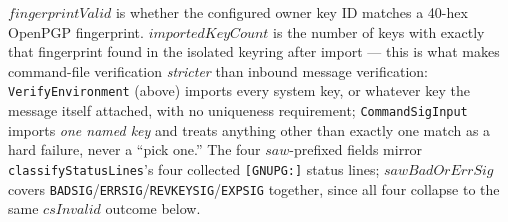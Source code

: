\documentclass[a4paper,10pt,fleqn]{article}
\begin{document}
$fingerprintValid$ is whether the configured owner key ID matches a
40-hex OpenPGP fingerprint.  $importedKeyCount$ is the number of
keys with exactly that fingerprint found in the isolated keyring
after import --- this is what makes command-file verification
\emph{stricter} than inbound message verification:
\texttt{VerifyEnvironment} (above) imports every system key, or
whatever key the message itself attached, with no uniqueness
requirement; \texttt{CommandSigInput} imports \emph{one named key}
and treats anything other than exactly one match as a hard failure,
never a ``pick one.''  The four $saw$-prefixed fields mirror
\texttt{classifyStatusLines}'s four collected \texttt{[GNUPG:]}
status lines; $sawBadOrErrSig$ covers
\texttt{BADSIG}/\texttt{ERRSIG}/\texttt{REVKEYSIG}/\texttt{EXPSIG}
together, since all four collapse to the same $csInvalid$ outcome
below.
\end{document}
